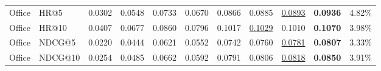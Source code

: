 \begin{table}[t]
{\begin{tabular}{llrrrrrrrrr}
\midrule
Office & HR@5    & 0.0302 & 0.0548 & 0.0733 & 0.0670 & 0.0866 & 0.0885 & \underline{0.0893} & \textbf{0.0936} & 4.82\% \\
Office & HR@10   & 0.0407 & 0.0677 & 0.0860 & 0.0796 & 0.1017 & \underline{0.1029} & 0.1010 & \textbf{0.1070} & 3.98\% \\
Office & NDCG@5  & 0.0220 & 0.0444 & 0.0621 & 0.0552 & 0.0742 & 0.0760 & \underline{0.0781} & \textbf{0.0807} & 3.33\% \\
Office & NDCG@10 & 0.0254 & 0.0485 & 0.0662 & 0.0592 & 0.0791 & 0.0806 & \underline{0.0818} & \textbf{0.0850} & 3.91\% \\
\bottomrule
\end{tabular}%
}
\end{table}

